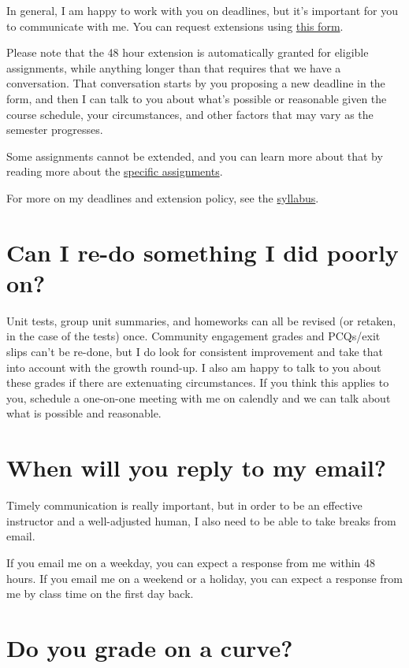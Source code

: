 \documentclass[
  letterpaper,
  DIV=11,
  numbers=noendperiod]{scrartcl}
\begin{document}
In general, I am happy to work with you on deadlines, but it's important
for you to communicate with me. You can request extensions using
\href{https://forms.gle/zwnNC37WGg4fV3ZN8}{this form}.

Please note that the 48 hour extension is automatically granted for
eligible assignments, while anything longer than that requires that we
have a conversation. That conversation starts by you proposing a new
deadline in the form, and then I can talk to you about what's possible
or reasonable given the course schedule, your circumstances, and other
factors that may vary as the semester progresses.

Some assignments cannot be extended, and you can learn more about that
by reading more about the \href{syllabus.qmd\#assignments}{specific
assignments}.

For more on my deadlines and extension policy, see the
\href{syllabus.qmd\#deadlines}{syllabus}.

\section{Can I re-do something I did poorly on?}\label{revisionpolicy}

Unit tests, group unit summaries, and homeworks can all be revised (or
retaken, in the case of the tests) once. Community engagement grades and
PCQs/exit slips can't be re-done, but I do look for consistent
improvement and take that into account with the growth round-up. I also
am happy to talk to you about these grades if there are extenuating
circumstances. If you think this applies to you, schedule a one-on-one
meeting with me on calendly and we can talk about what is possible and
reasonable.

\section{When will you reply to my email?}\label{emails}

Timely communication is really important, but in order to be an
effective instructor and a well-adjusted human, I also need to be able
to take breaks from email.

If you email me on a weekday, you can expect a response from me within
48 hours. If you email me on a weekend or a holiday, you can expect a
response from me by class time on the first day back.

\section{Do you grade on a curve?}\label{gradingcurve}
\end{document}
